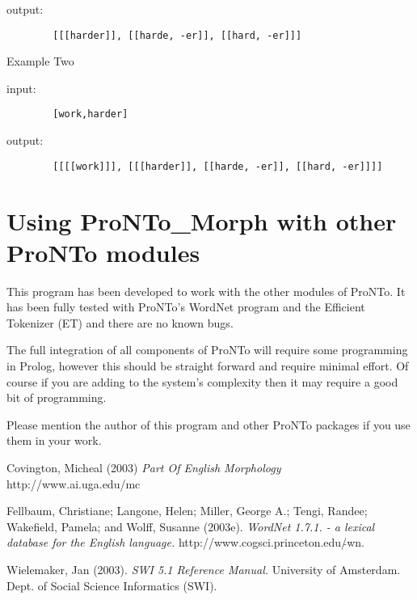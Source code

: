 output:

        \begin{verbatim}
        [[[harder]], [[harde, -er]], [[hard, -er]]]\end{verbatim}

Example Two\newline

input:


        \begin{verbatim}
        [work,harder]\end{verbatim}

output:

        \begin{verbatim}
        [[[[work]]], [[[harder]], [[harde, -er]], [[hard, -er]]]]\end{verbatim}


\section{Using ProNTo\_Morph with other ProNTo modules}

This program has been developed to work with the other modules of
ProNTo.  It has been fully tested with ProNTo's WordNet program
and the Efficient Tokenizer (ET) and there are no known
bugs.\newline

The full integration of all components of ProNTo will require some
programming in Prolog, however this should be straight forward and
require minimal effort. Of course if you are adding to the
system's complexity then it may require a good bit of
programming.\newline

Please mention the author of this program and other ProNTo
packages if you use them in your work.

\newpage

\begin{thebibliography}{}
\raggedright
\frenchspacing

\item[Covington, Micheal (2003)]
\emph{Part Of English Morphology}
http://www.ai.uga.edu/mc

\item[Fellbaum, Christiane; Langone, Helen; Miller, George A.;
Tengi, Randee;] Wakefield, Pamela; and Wolff, Susanne (2003e).
\emph{WordNet 1.7.1. - a lexical database for the English
language.} http://www.cogsci.princeton.edu/\( \tilde{} \)wn.

\item[Wielemaker, Jan (2003).] \emph{SWI 5.1 Reference Manual.}
University of Amsterdam. Dept. of Social Science Informatics
(SWI).

\end{thebibliography}


